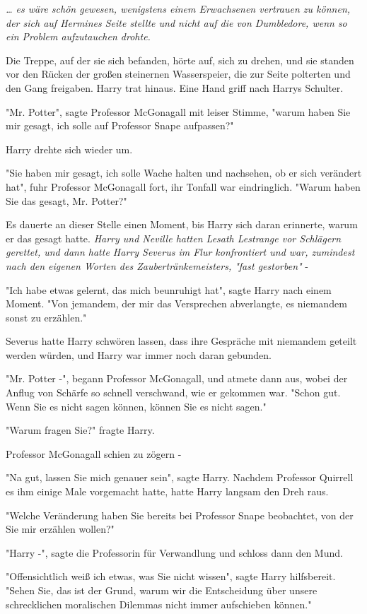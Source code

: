 {\emph{… es wäre schön gewesen, wenigstens einem Erwachsenen vertrauen zu können, der sich auf Hermines Seite stellte und nicht auf die von Dumbledore, wenn so ein Problem aufzutauchen drohte.}

Die Treppe, auf der sie sich befanden, hörte auf, sich zu drehen, und sie standen vor den Rücken der großen steinernen Wasserspeier, die zur Seite polterten und den Gang freigaben. Harry trat hinaus. Eine Hand griff nach Harrys Schulter.

"Mr. Potter", sagte Professor McGonagall mit leiser Stimme, "warum haben Sie mir gesagt, ich solle auf Professor Snape aufpassen?"

Harry drehte sich wieder um.

"Sie haben mir gesagt, ich solle Wache halten und nachsehen, ob er sich verändert hat", fuhr Professor McGonagall fort, ihr Tonfall war eindringlich. "Warum haben Sie das gesagt, Mr. Potter?"

Es dauerte an dieser Stelle einen Moment, bis Harry sich daran erinnerte, warum er das gesagt hatte. \emph{Harry und Neville hatten Lesath Lestrange vor Schlägern gerettet, und dann hatte Harry Severus im Flur konfrontiert und war, zumindest nach den eigenen Worten des Zaubertränkemeisters, "fast gestorben"} -

"Ich habe etwas gelernt, das mich beunruhigt hat", sagte Harry nach einem Moment. "Von jemandem, der mir das Versprechen abverlangte, es niemandem sonst zu erzählen."

Severus hatte Harry schwören lassen, dass ihre Gespräche mit niemandem geteilt werden würden, und Harry war immer noch daran gebunden.

"Mr. Potter -", begann Professor McGonagall, und atmete dann aus, wobei der Anflug von Schärfe so schnell verschwand, wie er gekommen war. "Schon gut. Wenn Sie es nicht sagen können, können Sie es nicht sagen."

"Warum fragen Sie?" fragte Harry.

Professor McGonagall schien zu zögern -

"Na gut, lassen Sie mich genauer sein", sagte Harry. Nachdem Professor Quirrell es ihm einige Male vorgemacht hatte, hatte Harry langsam den Dreh raus.

"Welche Veränderung haben Sie bereits bei Professor Snape beobachtet, von der Sie mir erzählen wollen?"

"Harry -", sagte die Professorin für Verwandlung und schloss dann den Mund.

"Offensichtlich weiß ich etwas, was Sie nicht wissen", sagte Harry hilfsbereit. "Sehen Sie, das ist der Grund, warum wir die Entscheidung über unsere schrecklichen moralischen Dilemmas nicht immer aufschieben können."

}
